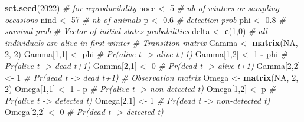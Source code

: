 \documentclass[
  12pt,
]{krantz}
\newenvironment{Shaded}{\begin{snugshade}}{\end{snugshade}}
\newcommand{\CommentTok}[1]{\textcolor[rgb]{0.56,0.35,0.01}{\textit{#1}}}
\newcommand{\ConstantTok}[1]{\textcolor[rgb]{0.56,0.35,0.01}{#1}}
\newcommand{\DecValTok}[1]{\textcolor[rgb]{0.00,0.00,0.81}{#1}}
\newcommand{\FloatTok}[1]{\textcolor[rgb]{0.00,0.00,0.81}{#1}}
\newcommand{\FunctionTok}[1]{\textcolor[rgb]{0.13,0.29,0.53}{\textbf{#1}}}
\newcommand{\NormalTok}[1]{#1}
\newcommand{\OtherTok}[1]{\textcolor[rgb]{0.56,0.35,0.01}{#1}}
\newcommand{\SpecialCharTok}[1]{\textcolor[rgb]{0.81,0.36,0.00}{\textbf{#1}}}
\begin{document}
\begin{Shaded}
\begin{Highlighting}[]
\FunctionTok{set.seed}\NormalTok{(}\DecValTok{2022}\NormalTok{) }\CommentTok{\# for reproducibility}
\NormalTok{nocc }\OtherTok{\textless{}{-}} \DecValTok{5} \CommentTok{\# nb of winters or sampling occasions}
\NormalTok{nind }\OtherTok{\textless{}{-}} \DecValTok{57} \CommentTok{\# nb of animals}
\NormalTok{p }\OtherTok{\textless{}{-}} \FloatTok{0.6} \CommentTok{\# detection prob}
\NormalTok{phi }\OtherTok{\textless{}{-}} \FloatTok{0.8} \CommentTok{\# survival prob}
\CommentTok{\# Vector of initial states probabilities}
\NormalTok{delta }\OtherTok{\textless{}{-}} \FunctionTok{c}\NormalTok{(}\DecValTok{1}\NormalTok{,}\DecValTok{0}\NormalTok{) }\CommentTok{\# all individuals are alive in first winter}
\CommentTok{\# Transition matrix}
\NormalTok{Gamma }\OtherTok{\textless{}{-}} \FunctionTok{matrix}\NormalTok{(}\ConstantTok{NA}\NormalTok{, }\DecValTok{2}\NormalTok{, }\DecValTok{2}\NormalTok{)}
\NormalTok{Gamma[}\DecValTok{1}\NormalTok{,}\DecValTok{1}\NormalTok{] }\OtherTok{\textless{}{-}}\NormalTok{ phi      }\CommentTok{\# Pr(alive t {-}\textgreater{} alive t+1)}
\NormalTok{Gamma[}\DecValTok{1}\NormalTok{,}\DecValTok{2}\NormalTok{] }\OtherTok{\textless{}{-}} \DecValTok{1} \SpecialCharTok{{-}}\NormalTok{ phi  }\CommentTok{\# Pr(alive t {-}\textgreater{} dead t+1)}
\NormalTok{Gamma[}\DecValTok{2}\NormalTok{,}\DecValTok{1}\NormalTok{] }\OtherTok{\textless{}{-}} \DecValTok{0}        \CommentTok{\# Pr(dead t {-}\textgreater{} alive t+1)}
\NormalTok{Gamma[}\DecValTok{2}\NormalTok{,}\DecValTok{2}\NormalTok{] }\OtherTok{\textless{}{-}} \DecValTok{1}        \CommentTok{\# Pr(dead t {-}\textgreater{} dead t+1)}
\CommentTok{\# Observation matrix }
\NormalTok{Omega }\OtherTok{\textless{}{-}} \FunctionTok{matrix}\NormalTok{(}\ConstantTok{NA}\NormalTok{, }\DecValTok{2}\NormalTok{, }\DecValTok{2}\NormalTok{)}
\NormalTok{Omega[}\DecValTok{1}\NormalTok{,}\DecValTok{1}\NormalTok{] }\OtherTok{\textless{}{-}} \DecValTok{1} \SpecialCharTok{{-}}\NormalTok{ p      }\CommentTok{\# Pr(alive t {-}\textgreater{} non{-}detected t)}
\NormalTok{Omega[}\DecValTok{1}\NormalTok{,}\DecValTok{2}\NormalTok{] }\OtherTok{\textless{}{-}}\NormalTok{ p          }\CommentTok{\# Pr(alive t {-}\textgreater{} detected t)}
\NormalTok{Omega[}\DecValTok{2}\NormalTok{,}\DecValTok{1}\NormalTok{] }\OtherTok{\textless{}{-}} \DecValTok{1}          \CommentTok{\# Pr(dead t {-}\textgreater{} non{-}detected t)}
\NormalTok{Omega[}\DecValTok{2}\NormalTok{,}\DecValTok{2}\NormalTok{] }\OtherTok{\textless{}{-}} \DecValTok{0}          \CommentTok{\# Pr(dead t {-}\textgreater{} detected t)}

\end{Highlighting}
\end{Shaded}
\end{document}

